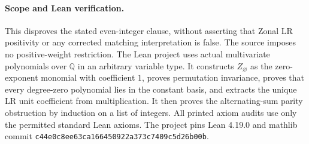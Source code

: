 \documentclass[11pt]{article}
\begin{document}
\paragraph{Scope and Lean verification.}
This disproves the stated even-integer clause, without asserting that
Zonal LR positivity or any corrected matching interpretation is false.
The source imposes no positive-weight restriction. The Lean project
uses actual multivariate polynomials over $\mathbb Q$ in an arbitrary
variable type. It constructs $Z_\varnothing$ as the zero-exponent
monomial with coefficient $1$, proves permutation invariance, proves
that every degree-zero polynomial lies in the constant basis, and
extracts the unique LR unit coefficient from multiplication. It then
proves the alternating-sum parity obstruction by induction on a list
of integers. All printed axiom audits use only the permitted standard
Lean axioms. The project pins Lean 4.19.0 and mathlib commit
\texttt{c44e0c8ee63ca166450922a373c7409c5d26b00b}.
\end{document}
